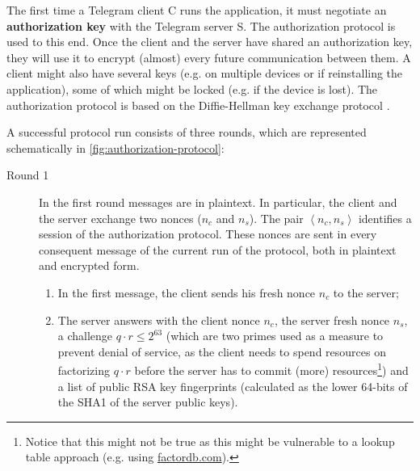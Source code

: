 The first time a Telegram client C runs the application, it must negotiate an \textbf{authorization key} with the Telegram server S. The authorization protocol is used to this end. Once the client and the server have shared an authorization key, they will use it to encrypt (almost) every future communication between them. A client might also have several keys (e.g. on multiple devices or if reinstalling the application), some of which might be locked (e.g. if the device is lost). The authorization protocol is based on the Diffie-Hellman key exchange protocol \cite{DH-protocol}.


A successful protocol run consists of three rounds, which are represented schematically in \cref{fig:authorization-protocol}:
\begin{description}
    \item[Round 1] In the first round messages are in plaintext. In particular, the client and the server exchange two nonces ($n_c$ and $n_s$). The pair $\left<n_c, n_s\right>$ identifies a session of the authorization protocol. These nonces are sent in every consequent message of the current run of the protocol, both in plaintext and encrypted form.
    \begin{enumerate}
        \item{In the first message, the client sends his fresh nonce $n_c$ to the server;}
        \item{The server answers with the client nonce $n_c$, the server fresh nonce $n_s$, a challenge $q \cdot r \leq 2^{63}$ (which are two primes used as a measure to prevent denial of service, as the client needs to spend resources on factorizing $q \cdot r$ before the server has to commit (more) resources\footnote{Notice that this might not be true as this might be vulnerable to a lookup table approach (e.g. using \href{http://factordb.com}{factordb.com}).}) and a list of public RSA key fingerprints (calculated as the lower 64-bits of the SHA1 of the server public keys).}
    \end{enumerate}


\end{description}
